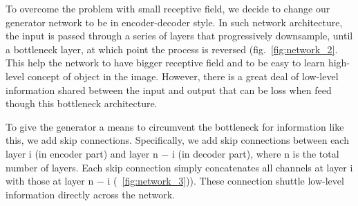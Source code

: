 \documentclass[10pt,twocolumn,letterpaper]{article}
\begin{document}
To overcome the problem with small receptive field, we decide to change our generator network to be in encoder-decoder style. In such network architecture, the input is passed through a series of layers
that progressively downsample, until a bottleneck layer, at which point the process is reversed (fig.~\ref{fig:network_2}. This help the network to have bigger receptive field and to be easy to learn high-level concept of object in the image. However, there is a great deal of low-level information
shared between the input and output that can be loss when feed though this bottleneck architecture. 

To give the generator a means to circumvent the bottleneck for information like this, we add skip connections. Specifically, we add skip connections between each layer i (in encoder part) and layer n − i (in decoder part), where n is the total number of layers. Each skip connection simply concatenates all channels at layer i with those at layer n − i (~\ref{fig:network_3})). These connection shuttle low-level information directly across the network.
\end{document}
